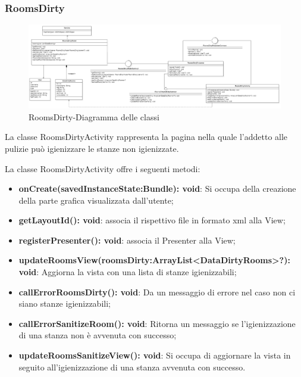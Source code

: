 \subsubsection{RoomsDirty}
\begin{figure}[H]
	\centering
	\includegraphics[width=16cm]{res/images/RoomsDirty.png}
	\caption{RoomsDirty-Diagramma delle classi}
	\label{fig:RoomsDirty-Diagramma delle classi}
\end{figure}
La classe RoomsDirtyActivity rappresenta la pagina nella quale l'addetto alle pulizie può igienizzare le stanze non igienizzate.

La classe RoomsDirtyActivity offre i seguenti metodi:
\begin{itemize}
	\item \textbf{onCreate(savedInstanceState:Bundle): void}: Si occupa della creazione della parte grafica visualizzata dall'utente; 
	\item \textbf{getLayoutId(): void}: associa il rispettivo file in formato xml alla View;
	\item \textbf{registerPresenter(): void}: associa il Presenter alla View; 
	\item \textbf{updateRoomsView(roomsDirty:ArrayList<DataDirtyRooms>?): void}: Aggiorna la vista con una lista di stanze igienizzabili; 
	\item \textbf{callErrorRoomsDirty(): void}: Da un messaggio di errore nel caso non ci siano stanze igienizzabili;
	\item \textbf{callErrorSanitizeRoom(): void}: Ritorna un messaggio se l'igienizzazione di una stanza non è avvenuta con successo; 
	\item \textbf{updateRoomsSanitizeView(): void}: Si occupa di aggiornare la vista in seguito all'igienizzazione di una stanza avvenuta con successo.
\end{itemize}

